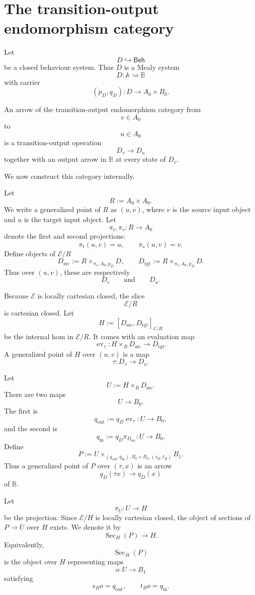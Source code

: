 \section{The transition-output endomorphism category}
\label{sec:eilenberg-transout-category}

Let
\[
D\hookrightarrow\mathsf{Beh}
\]
be a closed behaviour system. Thus \(D\) is a Mealy system
\[
D:\mathbb A\rightsquigarrow\mathbb B
\]
with carrier
\[
(p_D,q_D):D\to A_0\times B_0.
\]

An arrow of the transition-output endomorphism category from
\[
v\in A_0
\]
to
\[
u\in A_0
\]
is a transition-output operation
\[
D_v\to D_u
\]
together with an output arrow in \(\mathbb B\) at every state of \(D_v\).

We now construct this category internally.

Let
\[
R:=A_0\times A_0.
\]
We write a generalized point of \(R\) as \((u,v)\), where \(v\) is the source
input object and \(u\) is the target input object. Let
\[
\pi_t,\pi_s:R\to A_0
\]
denote the first and second projections:
\[
\pi_t(u,v)=u,
\qquad
\pi_s(u,v)=v.
\]
Define objects of \(\mathcal E/R\)
\[
D_{\mathrm{src}}
:=
R\times_{\pi_s,A_0,p_D}D,
\qquad
D_{\mathrm{tgt}}
:=
R\times_{\pi_t,A_0,p_D}D.
\]
Thus over \((u,v)\), these are respectively
\[
D_v
\qquad\text{and}\qquad
D_u.
\]

Because \(\mathcal E\) is locally cartesian closed, the slice
\[
\mathcal E/R
\]
is cartesian closed. Let
\[
H:=[D_{\mathrm{src}},D_{\mathrm{tgt}}]_{\mathcal E/R}
\]
be the internal hom in \(\mathcal E/R\). It comes with an evaluation map
\[
\operatorname{ev}_{\tau}:
H\times_R D_{\mathrm{src}}
\to
D_{\mathrm{tgt}}.
\]
A generalized point of \(H\) over \((u,v)\) is a map
\[
\tau:D_v\to D_u.
\]

Let
\[
U:=H\times_R D_{\mathrm{src}}.
\]
There are two maps
\[
U\to B_0.
\]
The first is
\[
q_{\mathrm{out}}
:=
q_D\operatorname{ev}_{\tau}:U\to B_0,
\]
and the second is
\[
q_{\mathrm{in}}
:=
q_D\pi_{D_{\mathrm{src}}}:U\to B_0.
\]
Define
\[
P:=
U\times_{(q_{\mathrm{out}},q_{\mathrm{in}}),B_0\times B_0,(s_B,t_B)}B_1.
\]
Thus a generalized point of \(P\) over \((\tau,x)\) is an arrow
\[
q_D(\tau x)\to q_D(x)
\]
of \(\mathbb B\).

Let
\[
\pi_U:U\to H
\]
be the projection. Since \(\mathcal E/H\) is locally cartesian closed, the
object of sections of \(P\to U\) over \(H\) exists. We denote it by
\[
\operatorname{Sec}_H(P)\to H.
\]
Equivalently,
\[
\operatorname{Sec}_H(P)
\]
is the object over \(H\) representing maps
\[
o:U\to B_1
\]
satisfying
\[
s_Bo=q_{\mathrm{out}},
\qquad
t_Bo=q_{\mathrm{in}}.
\]

